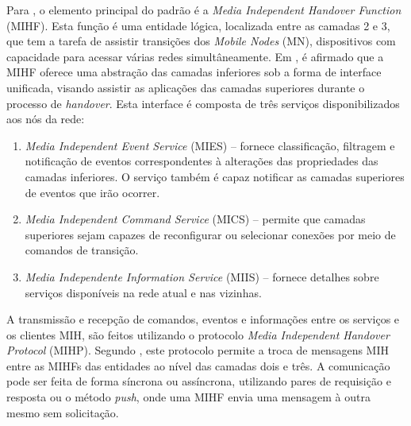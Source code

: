 \documentclass[12pt]{article}
\begin{document}
Para \cite{piri:2009}, o elemento principal do padrão é a \textit{Media 
Independent Handover Function} (MIHF). Esta função é uma entidade lógica, 
localizada entre as camadas 2 e 3, que tem a tarefa de assistir transições dos 
\textit{Mobile Nodes} (MN), dispositivos com capacidade para acessar várias 
redes simultâneamente. Em \cite{kimhun:2010}, é afirmado que a MIHF oferece 
uma abstração das camadas inferiores sob a forma de interface unificada, 
visando assistir as aplicações das camadas superiores durante o processo de 
\textit{handover}. Esta interface é composta de três serviços disponibilizados 
aos nós da rede:

\begin{enumerate}

	\item \textit{Media Independent Event Service} (MIES) -- fornece 
	classificação, filtragem e notificação de eventos correspondentes à 
	alterações das propriedades das camadas inferiores. O serviço também é 
	capaz notificar as camadas superiores de eventos que irão ocorrer.

	\item \textit{Media Independent Command Service} (MICS) -- permite que 
	camadas superiores sejam capazes de reconfigurar ou selecionar 
	conexões por meio de comandos de transição.

	\item \textit{Media Independente Information Service} (MIIS) --  
	fornece detalhes sobre serviços disponíveis na rede atual e nas 
	vizinhas.
	
\end{enumerate}

A transmissão e recepção de comandos, eventos e informações entre os serviços 
e os clientes MIH, são feitos utilizando o protocolo \textit{Media Independent 
Handover Protocol} (MIHP). Segundo \cite{ieee:2008:80221}, este protocolo 
permite a troca de mensagens MIH entre as MIHFs das entidades ao nível das 
camadas dois e três. A comunicação pode ser feita de forma síncrona ou 
assíncrona, utilizando pares de requisição e resposta ou o método 
\textit{push}, onde uma MIHF envia uma mensagem à outra mesmo sem solicitação.

\end{document}
